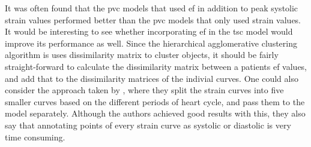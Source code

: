 It was often found that the \acrshort{pvc} models that used \acrshort{ef} in addition to peak systolic strain values performed better than the \acrshort{pvc} models that only used strain values. It would be interesting to see whether incorporating \acrshort{ef} in the \acrshort{tsc} model would improve its performance as well. Since the hierarchical agglomerative clustering algorithm is uses dissimilarity matrix to cluster objects, it should be fairly straight-forward to calculate the dissimilarity matrix between a patients \acrshort{ef} values, and add that to the dissimilarity matrices of the indivial curves. One could also consider the approach taken by \cite{myocardial_motion_pattern}, where they split the strain curves into five smaller curves based on the different periods of heart cycle, and pass them to the model separately. Although the authors achieved good results with this, they also say that annotating points of every strain curve as systolic or diastolic is very time consuming.


